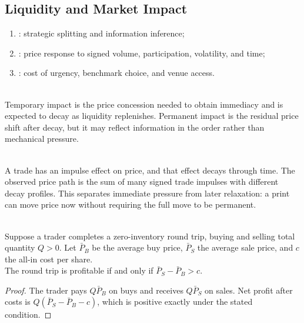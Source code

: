 \documentclass[a4paper,oneside,openany]{book}
\begin{document}
\subsection*{Liquidity and Market Impact}

\begin{taxonomy} 
\begin{enumerate}[label=\roman*.]
\setlength{\itemsep}{0pt}
\item {}: strategic splitting and information inference;
\item {}: price response to signed volume, participation, volatility, and time;
\item {}: cost of urgency, benchmark choice, and venue access.
\end{enumerate}
\end{taxonomy}

\begin{definition} \\
Temporary impact is the price concession needed to obtain immediacy and is expected to decay as liquidity replenishes. Permanent impact is the residual price shift after decay, but it may reflect information in the order rather than mechanical pressure.
\end{definition}

\begin{mechanism} \\
A trade has an impulse effect on price, and that effect decays through time. The observed price path is the sum of many signed trade impulses with different decay profiles. This separates immediate pressure from later relaxation: a print can move price now without requiring the full move to be permanent.
\end{mechanism}

\begin{proposition} \\
Suppose a trader completes a zero-inventory round trip, buying and selling total quantity $Q>0$. Let $\bar{P}_B$ be the average buy price, $\bar{P}_S$ the average sale price, and $c$ the all-in cost per share.\\
The round trip is profitable if and only if $\bar{P}_S-\bar{P}_B>c$.
\begin{proof}
The trader pays $Q\bar{P}_B$ on buys and receives $Q\bar{P}_S$ on sales. Net profit after costs is $Q(\bar{P}_S-\bar{P}_B-c)$, which is positive exactly under the stated condition.
\end{proof}
\end{proposition}
\end{document}
